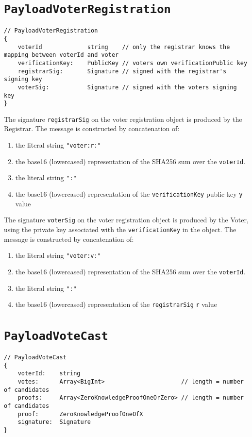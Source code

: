 \section*{\texttt{PayloadVoterRegistration}}
\label{dt:payload:reg}
\begin{lstlisting}[style=ES6]
// PayloadVoterRegistration
{
    voterId             string    // only the registrar knows the mapping between voterId and voter
    verificationKey:    PublicKey // voters own verificationPublic key
    registrarSig:       Signature // signed with the registrar's signing key
    voterSig:           Signature // signed with the voters signing key
}
\end{lstlisting}

The signature \texttt{registrarSig} on the voter registration object is produced by the Registrar. The message is constructed by concatenation of:

\begin{enumerate}
    \item the literal string \lstinline[style=ES6]{"voter:r:"}
    \item the base16 (lowercased) representation of the SHA256 sum over the \texttt{voterId}.
    \item the literal string \lstinline[style=ES6]{":"}
    \item the base16 (lowercased) representation of the \texttt{verificationKey} public key \texttt{y} value
\end{enumerate}

The signature \texttt{voterSig} on the voter registration object is produced by the Voter, using the private key associated with the \texttt{verificationKey} in the object. The message is constructed by concatenation of:

\begin{enumerate}
    \item the literal string \lstinline[style=ES6]{"voter:v:"}
    \item the base16 (lowercased) representation of the SHA256 sum over the \texttt{voterId}.
    \item the literal string \lstinline[style=ES6]{":"}
    \item the base16 (lowercased) representation of the \texttt{registrarSig} \texttt{r} value
\end{enumerate}

\section*{\texttt{PayloadVoteCast}}
\label{dt:payload:cast}
\begin{lstlisting}[style=ES6]
// PayloadVoteCast
{
    voterId:    string
    votes:      Array<BigInt>                      // length = number of candidates
    proofs:     Array<ZeroKnowledgeProofOneOrZero> // length = number of candidates
    proof:      ZeroKnowledgeProofOneOfX
    signature:  Signature
}
\end{lstlisting}

